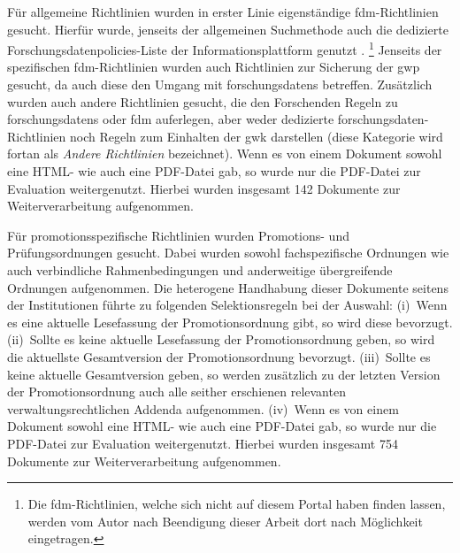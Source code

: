 Für allgemeine Richtlinien wurden in erster Linie eigenständige \gls{fdm}-Richtlinien gesucht.
Hierfür wurde, jenseits der allgemeinen Suchmethode auch die dedizierte Forschungsdatenpolicies-Liste der Informationsplattform \citeauthor{Forschungsdaten2024} genutzt \autocite{Forschungsdaten2024}.%
\footnote{%
    Die \gls{fdm}-Richtlinien, welche sich nicht auf diesem Portal haben finden lassen, werden vom Autor nach Beendigung dieser Arbeit dort nach Möglichkeit eingetragen.%
}
Jenseits der spezifischen \gls{fdm}-Richtlinien wurden auch Richtlinien zur Sicherung der \gls{gwp} gesucht, da auch diese den Umgang mit \glspl{forschungsdaten} betreffen.
Zusätzlich wurden auch andere Richtlinien gesucht, die den Forschenden Regeln zu \glspl{forschungsdaten} oder \gls{fdm} auferlegen, aber weder dedizierte \gls{forschungsdaten}-Richtlinien noch Regeln zum Einhalten der \gls{gwk} darstellen (diese Kategorie wird fortan als \textit{Andere Richtlinien} bezeichnet).
Wenn es von einem Dokument sowohl eine HTML- wie auch eine PDF-Datei gab, so wurde nur die PDF-Datei zur Evaluation weitergenutzt.
Hierbei wurden insgesamt \num{142} Dokumente zur Weiterverarbeitung aufgenommen.

Für promotionsspezifische Richtlinien wurden Promotions- und Prüfungsordnungen gesucht.
Dabei wurden sowohl fachspezifische Ordnungen wie auch verbindliche Rahmenbedingungen und anderweitige übergreifende Ordnungen aufgenommen.
Die heterogene Handhabung dieser Dokumente seitens der Institutionen führte zu folgenden Selektionsregeln bei der Auswahl:
(i)~Wenn es eine aktuelle Lesefassung der Promotionsordnung gibt, so wird diese bevorzugt.
(ii)~Sollte es keine aktuelle Lesefassung der Promotionsordnung geben, so wird die aktuellste Gesamtversion der Promotionsordnung bevorzugt.
(iii)~Sollte es keine aktuelle Gesamtversion geben, so werden zusätzlich zu der letzten Version der Promotionsordnung auch alle seither erschienen relevanten verwaltungsrechtlichen Addenda aufgenommen.
(iv)~Wenn es von einem Dokument sowohl eine HTML- wie auch eine PDF-Datei gab, so wurde nur die PDF-Datei zur Evaluation weitergenutzt.
Hierbei wurden insgesamt \num{754} Dokumente zur Weiterverarbeitung aufgenommen.

